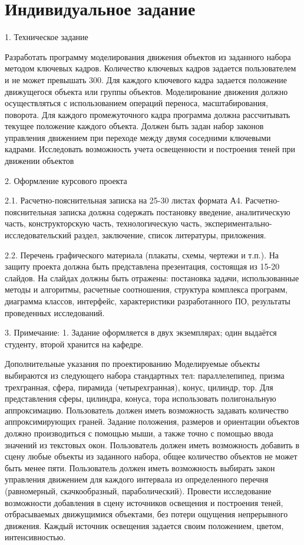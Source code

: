 \chapter*{Индивидуальное задание}


1. Техническое задание

Разработать программу моделирования движения объектов из заданного набора методом ключевых кадров. Количество ключевых кадров задается пользователем и не может превышать 300. Для каждого ключевого кадра задается положение движущегося объекта или группы объектов. Моделирование движения должно осуществляться с использованием операций переноса, масштабирования, поворота. Для каждого промежуточного кадра программа должна рассчитывать текущее положение каждого объекта. Должен быть задан набор законов управления движением при переходе между двумя соседними ключевыми кадрами. Исследовать возможность учета освещенности и построения теней при движении объектов

2. Оформление курсового проекта

2.1. Расчетно-пояснительная записка на 25-30  листах формата А4.
Расчетно-пояснительная записка должна содержать постановку введение, аналитическую часть, конструкторскую часть, технологическую часть, экспериментально-исследовательский раздел, заключение, список литературы, приложения.

2.2. Перечень графического материала (плакаты, схемы, чертежи и т.п.). На защиту проекта должна быть представлена презентация, состоящая из 15-20 слайдов. На слайдах должны быть отражены: постановка задачи, использованные методы и алгоритмы, расчетные соотношения, структура комплекса программ, диаграмма классов, интерфейс, характеристики разработанного ПО, результаты проведенных исследований.



3. Примечание:
    1. Задание оформляется в двух экземплярах; один выдаётся студенту, второй хранится на кафедре.

Дополнительные указания по проектированию
Моделируемые объекты выбираются из следующего набора стандартных тел:  параллелепипед, призма трехгранная, сфера, пирамида (четырехгранная), конус, цилиндр, тор. Для представления сферы, цилиндра, конуса, тора использовать полигональную аппроксимацию. 
     Пользователь должен иметь возможность задавать количество аппроксимирующих граней.
Задание положения, размеров и ориентации объектов должно производиться с помощью мыши, а также точно с помощью ввода значений из текстовых окон.
    Пользователь должен иметь возможность добавить в сцену любые объекты из заданного набора, общее количество объектов не может быть менее пяти.
   Пользователь должен иметь возможность выбирать закон управления движением для каждого интервала из определенного перечня (равномерный, скачкообразный, параболический).
   Провести исследование возможности добавления в сцену источников освещения и построения теней, отбрасываемых движущимися объектами, без потери ощущения непрерывного движения. Каждый источник освещения задается своим положением, цветом, интенсивностью.



